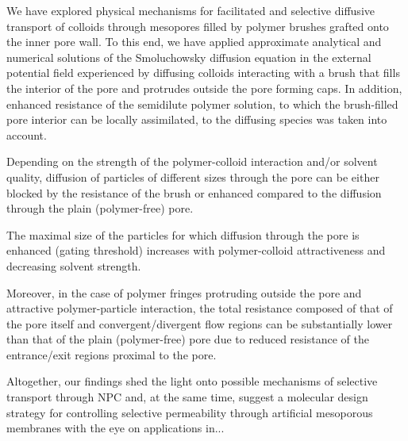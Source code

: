 \documentclass[12pt, a4paper]{article}
\begin{document}

We have explored physical mechanisms for facilitated and selective diffusive transport of colloids through mesopores filled by polymer brushes grafted onto the inner pore wall. 
To this end, we have applied approximate analytical and numerical solutions of the Smoluchowsky diffusion equation 
in the external potential field experienced by diffusing colloids interacting with a brush that fills the interior of the pore
and protrudes outside the pore forming caps. In addition, enhanced resistance of the semidilute polymer solution, to which the brush-filled pore
interior can be locally assimilated, to the diffusing species was taken into account. 

Depending on the strength of the polymer-colloid interaction and/or solvent quality, diffusion of particles of different sizes
through the pore can be either blocked by the resistance of the brush or enhanced compared to the diffusion through the plain (polymer-free) pore. 

The maximal size of the particles for which diffusion through the pore is enhanced (gating threshold) increases with polymer-colloid attractiveness and decreasing solvent strength.

Moreover, in the case of polymer fringes protruding outside the pore and attractive polymer-particle interaction, the total resistance composed of that of the pore itself 
and convergent/divergent flow regions can be substantially lower than that of the plain (polymer-free) pore due to reduced resistance of the entrance/exit regions proximal to the pore.

Altogether, our findings shed the light onto possible mechanisms of selective transport through NPC and, at the same time, suggest a molecular design strategy for controlling selective
permeability through artificial mesoporous membranes with the eye on applications in...


\printbibliography
\end{document}
